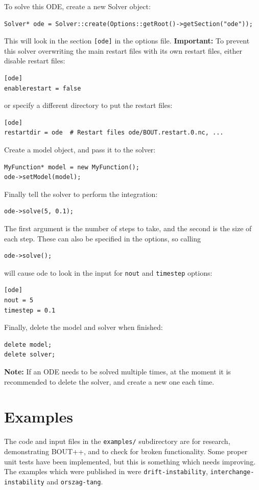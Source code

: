 \documentclass[12pt]{article}
\begin{document}
To solve this ODE, create a new Solver object:
\begin{lstlisting}[numbers=none]
Solver* ode = Solver::create(Options::getRoot()->getSection("ode"));
\end{lstlisting}
This will look in the section \texttt{[ode]} in the options file.
{\bf Important:} To prevent this solver overwriting the main restart files
with its own restart files, either disable restart files:
\begin{lstlisting}[numbers=none]
[ode]
enablerestart = false
\end{lstlisting}
or specify a different directory to put the restart files:
\begin{lstlisting}[numbers=none]
[ode]
restartdir = ode  # Restart files ode/BOUT.restart.0.nc, ...
\end{lstlisting}

Create a model object, and pass it to the solver:
\begin{lstlisting}[numbers=none]
MyFunction* model = new MyFunction();
ode->setModel(model);
\end{lstlisting}

Finally tell the solver to perform the integration:
\begin{lstlisting}[numbers=none]
ode->solve(5, 0.1);
\end{lstlisting}
The first argument is the number of steps to take, and the second is the size of each step. These can also be specified in the options, so calling
\begin{lstlisting}[numbers=none]
ode->solve();
\end{lstlisting}
will cause ode to look in the input for \texttt{nout} and \texttt{timestep} options:
\begin{lstlisting}[numbers=none]
[ode]
nout = 5
timestep = 0.1
\end{lstlisting}
Finally, delete the model and solver when finished:
\begin{lstlisting}[numbers=none]
delete model;
delete solver;
\end{lstlisting}

{\bf Note: } If an ODE needs to be solved multiple times, at the moment
it is recommended to delete the solver, and create a new one each time. 

\section{Examples}
\label{sec:examples}

The code and input files in the \texttt{examples/} subdirectory are for research, demonstrating BOUT++, 
and to check for broken functionality. Some proper unit tests have been implemented, but this
is something which needs improving. The examples which were published in \cite{Dudson2009,dudson-2008-arxiv}
were \texttt{drift-instability}, \texttt{interchange-instability} and \texttt{orszag-tang}.
\end{document}
